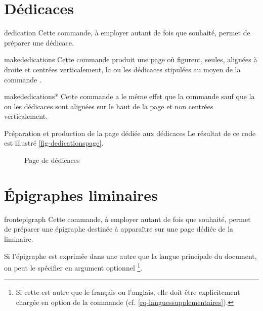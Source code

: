 \section{Dédicaces}

\begin{docCommand}{dedication}{}
  Cette commande, à employer autant de fois que
  souhaité\hauteurpage{}, permet de préparer une dédicace.
\end{docCommand}

\begin{docCommand}{makededications}{}
  Cette commande produit une page où figurent, seules, alignées à droite et
  centrées verticalement, la ou les dédicaces stipulées au moyen de la commande
  .
\end{docCommand}
%
\begin{docCommand}{makededications*}{}
  Cette commande a le même effet que la commande  sauf
  que la ou les dédicaces sont alignées sur le haut de la page et non centrées
  verticalement.
\end{docCommand}

\begin{dbexample}{Préparation et production de la page dédiée aux dédicaces}{}
  \NoAutoSpacing%
  Le résultat de ce code est illustré \vref{fig-dedicationspage}.
\end{dbexample}

\begin{figure}[htbp]
  \centering
  \caption{Page de dédicaces}
  \label{fig-dedicationspage}
\end{figure}

\section{Épigraphes liminaires}

\begin{docCommand}{frontepigraph}{}
  Cette commande, à employer autant de fois que souhaité\hauteurpage{}, permet
  de préparer une épigraphe destinée à apparaître sur une page dédiée de la
  \gls{liminaire}.

  Si l'épigraphe est exprimée dans une   autre que la langue principale du document, on peut le
  spécifier en argument optionnel%
  \footnote{Si cette  est autre que le français ou l'anglais, elle
    doit être explicitement chargée en option de la commande
     (cf.  \vref{rq-languessupplementaires}).}.
\end{docCommand}


